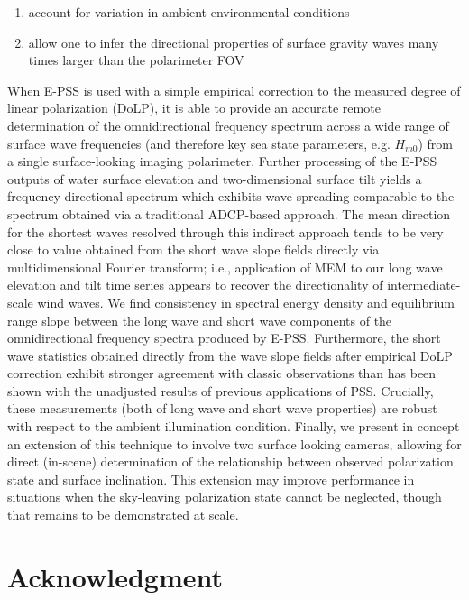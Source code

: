 \documentclass[letterpaper,journal]{IEEEtran}
\begin{document}
	\begin{enumerate}
		\item account for variation in ambient environmental conditions
		\item allow one to infer the directional properties of surface gravity waves many times larger than the polarimeter FOV
	\end{enumerate}
	
	\noindent When E-PSS is used with a simple empirical correction to the measured degree of linear polarization (DoLP), it is able to provide an accurate remote determination of the omnidirectional frequency spectrum across a wide range of surface wave frequencies (and therefore key sea state parameters, e.g. $H_{m0}$) from a single surface-looking imaging polarimeter. Further processing of the E-PSS outputs of water surface elevation and two-dimensional surface tilt yields a frequency-directional spectrum which exhibits wave spreading comparable to the spectrum obtained via a traditional ADCP-based approach. The mean direction for the shortest waves resolved through this indirect approach tends to be very close to value obtained from the short wave slope fields directly via multidimensional Fourier transform; i.e., application of MEM to our long wave elevation and tilt time series appears to recover the directionality of intermediate-scale wind waves. We find consistency in spectral energy density and equilibrium range slope between the long wave and short wave components of the omnidirectional frequency spectra produced by E-PSS. Furthermore, the short wave statistics obtained directly from the wave slope fields after empirical DoLP correction exhibit stronger agreement with classic observations than has been shown with the unadjusted results of previous applications of PSS. Crucially, these measurements (both of long wave and short wave properties) are robust with respect to the ambient illumination condition. Finally, we present in concept an extension of this technique to involve two surface looking cameras, allowing for direct (in-scene) determination of the relationship between observed polarization state and surface inclination. This extension may improve performance in situations when the sky-leaving polarization state cannot be neglected, though that remains to be demonstrated at scale.
	
	\section*{Acknowledgment}
	
\end{document}
